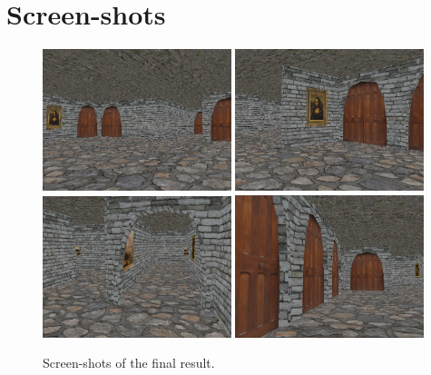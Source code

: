 \chapter{Screen-shots}
\label{screenshots}

\begin{figure}[h!]
\centering
\includegraphics[width=0.49\textwidth]{images/dungeon02.png}
\includegraphics[width=0.49\textwidth]{images/dungeon03.png}
\includegraphics[width=0.49\textwidth]{images/dungeon04.png}
\includegraphics[width=0.49\textwidth]{images/dungeon05.png}
\caption{Screen-shots of the final result.}
\end{figure}

